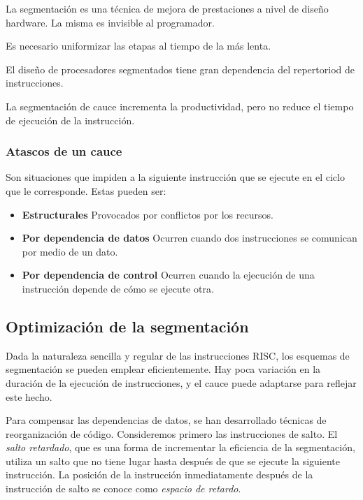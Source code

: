 La segmentación es una técnica de mejora de prestaciones a nivel de diseño hardware. La misma es invisible al programador.

Es necesario uniformizar las etapas al tiempo de la más lenta.

El diseño de procesadores segmentados tiene gran dependencia del repertoriod de instrucciones.

La segmentación de cauce incrementa la productividad, pero no reduce el tiempo de ejecución de la instrucción.

\subsubsection{Atascos de un cauce}

Son situaciones que impiden a la siguiente instrucción que se ejecute en el ciclo que le corresponde. Estas pueden ser:

\begin{itemize}
  \item \textbf{Estructurales}
  \subitem Provocados por conflictos por los recursos.
  \item \textbf{Por dependencia de datos}
  \subitem Ocurren cuando dos instrucciones se comunican por medio de un dato.
  \item \textbf{Por dependencia de control}
  \subitem Ocurren cuando la ejecución de una instrucción depende de cómo se ejecute otra. 
\end{itemize}

\subsection{Optimización de la segmentación}

Dada la naturaleza sencilla y regular de las instrucciones RISC, los esquemas de segmentación se pueden emplear eficientemente. Hay poca variación en la duración de la ejecución de instrucciones, y el cauce puede adaptarse para reflejar este hecho.

Para compensar las dependencias de datos, se han desarrollado técnicas de reorganización de código. Consideremos primero las instrucciones de salto. El \textit{salto retardado}, que es una forma de incrementar la eficiencia de la segmentación, utiliza un salto que no tiene lugar hasta después de que se ejecute la siguiente instrucción. La posición de la instrucción inmediatamente después de la instrucción de salto se conoce como \textit{espacio de retardo}.

